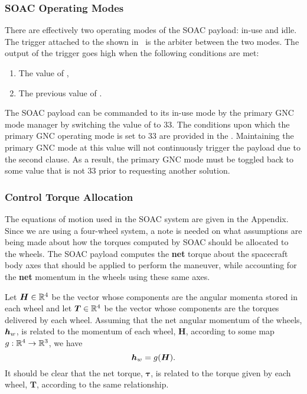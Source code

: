 \documentclass[10pt]{article}
\begin{document}
\subsubsection{SOAC Operating Modes}\label{sec3:op_modes}
There are effectively two operating modes of the SOAC payload: in-use and idle. The trigger attached to the  shown in~ is the arbiter between the two modes. The output of the trigger goes high when the following conditions are met:
\begin{enumerate}
\item The value of ,
\item The previous value of .
\end{enumerate}
The SOAC payload can be commanded to its in-use mode by the primary GNC mode manager by switching the value of  to $33$. The conditions upon which the primary GNC operating mode is set to $33$ are provided in the . Maintaining the primary GNC mode at this value will not continuously trigger the payload due to the second clause. As a result, the primary GNC mode must be toggled back to some value that is not $33$ prior to requesting another solution.  


\subsubsection{Control Torque Allocation}\label{sec3:allocation}

The equations of motion used in the SOAC system are given in the Appendix. Since we are using a four-wheel system, a note is needed on what assumptions are being made about how the torques computed by SOAC should be allocated to the wheels. The SOAC payload computes the \textbf{net} torque about the spacecraft body axes that should be applied to perform the maneuver, while accounting for the \textbf{net} momentum in the wheels using these same axes. 

Let $\bm{H}\in{\mathbb{R}}^4$ be the vector whose components are the angular momenta stored in each wheel and let $\bm{T}\in{\mathbb{R}}^4$ be the vector whose components are the torques delivered by each wheel. Assuming that the net angular momentum of the wheels, $\bm{h}_w$, is related to the momentum of each wheel, $\bm{H}$, according to some map $g : {\mathbb{R}}^4 \rightarrow {\mathbb{R}}^3$, we have
\begin{equation}
\bm{h}_w = g(\bm{H}).
\end{equation}
It should be clear that the net torque, $\bm{\tau}$, is related to the torque given by each wheel, $\bm{T}$, according to the same relationship. 
\end{document}
